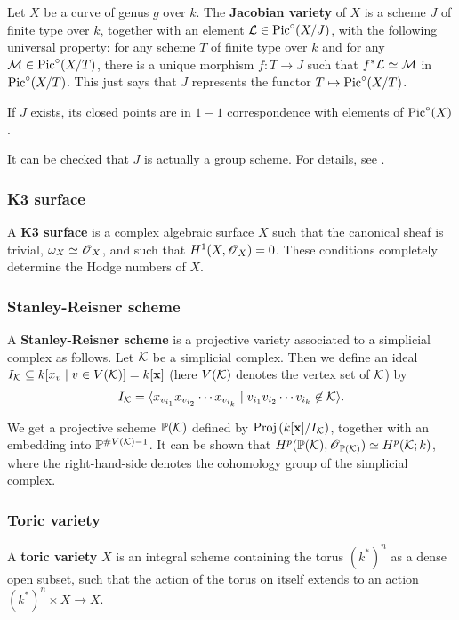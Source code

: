 \documentclass[11pt, english]{article}
\begin{document}
Let $X$ be a curve of genus $g$ over $k$. The \textbf{Jacobian variety} of $X$ is a scheme $J$ of finite type over $k$, together with an element $\mathcal{L} \in \operatorname{Pic}^\circ(X/J)$, with the following universal property: for any scheme $T$ of finite type over $k$ and for any $\mathcal M \in \operatorname{Pic}^\circ(X/T)$, there is a unique morphism $f:T \to J$ such that $f^\ast \mathcal{L} \simeq \mathcal M$ in $\operatorname{Pic}^\circ (X/T)$. This just says that $J$ represents the functor $T \mapsto \operatorname{Pic}^\circ(X/T)$. 

If $J$ exists, its closed points are in $1-1$ correspondence with elements of $\operatorname{Pic}^\circ (X)$.

It can be checked that $J$ is actually a group scheme. For details, see \cite[Ch. IV.4]{hartshorne}.

\subsubsection{K3 surface}
\label{k3}

A \textbf{K3 surface} is a complex algebraic surface $X$ such that the \hyperref[canonicaldivisor]{canonical sheaf} is trivial, $\omega_X \simeq \operatorname{\mathscr{O}}_X$, and such that $H^1(X,\operatorname{\mathscr{O}}_X)=0$. These conditions completely determine the Hodge numbers of $X$.

\subsubsection{Stanley-Reisner scheme}
\label{srscheme}

A \textbf{Stanley-Reisner scheme} is a projective variety associated to a simplicial complex as follows. Let $\mathcal K$ be a simplicial complex. Then we define an ideal $I_\mathcal K \subseteq k[x_v \mid v \in V(\mathcal K)] = k[\mathbf x]$ (here $V(\mathcal K)$ denotes the vertex set of $\mathcal K$) by
\[
I_\mathcal K = \langle x_{v_{i_1}}x_{v_{i_2}}\cdots x_{v_{i_k}} \mid v_{i_1}v_{i_2}\cdots v_{i_k} \not \in \mathcal K \rangle.
\]

We get a projective scheme $\mathbb{P}(\mathcal K)$ defined by $\operatorname{Proj} \left (k[ \mathbf x]/I_\mathcal K \right)$, together with an embedding into $\mathbb{P}^{\# V(\mathcal K)-1}$. It can be shown that $H^p(\mathbb{P}(\mathcal K),\operatorname{\mathscr{O}}_{\mathbb{P}(\mathcal K)}) \simeq H^p(\mathcal K;k)$, where the right-hand-side denotes the cohomology group of the simplicial complex.

\subsubsection{Toric variety}
\label{toricvariety}

A \textbf{toric variety} $X$ is an integral scheme containing the torus $(k^\ast)^n$ as a dense open subset, such that the action of the torus on itself extends to an action $(k^\ast)^n \times X \to X$.
\end{document}
